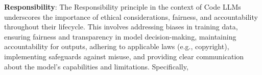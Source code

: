 \textbf{Responsibility}: 
The Responsibility principle in the context of Code LLMs underscores the importance of ethical considerations, fairness, and accountability throughout their lifecycle. This involves addressing biases in training data, ensuring fairness and transparency in model decision-making, maintaining accountability for outputs, adhering to applicable laws (e.g., copyright), implementing safeguards against misuse, and providing clear communication about the model's capabilities and limitations.
Specifically, 
